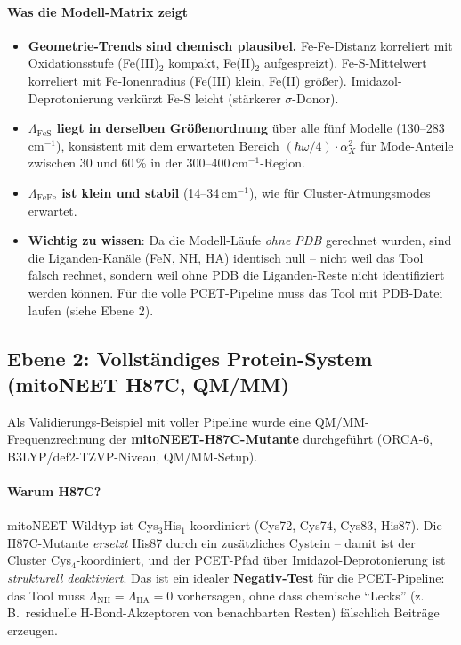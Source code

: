 \documentclass[11pt,a4paper,twoside]{article}
\theoremstyle{remark}
\begin{document}
\paragraph{Was die Modell-Matrix zeigt}
\begin{itemize}\setlength{\itemsep}{0pt}
  \item \textbf{Geometrie-Trends sind chemisch plausibel.}
        Fe-Fe-Distanz korreliert mit Oxidationsstufe (Fe(III)$_2$
        kompakt, Fe(II)$_2$ aufgespreizt). Fe-S-Mittelwert
        korreliert mit Fe-Ionenradius (Fe(III) klein, Fe(II)
        gr\"o{\ss}er). Imidazol-Deprotonierung verk\"urzt Fe-S leicht
        (st\"arkerer $\sigma$-Donor).
  \item \textbf{$\Lambda_\text{FeS}$ liegt in derselben Gr\"o{\ss}enordnung}
        \"uber alle f\"unf Modelle (130--283\,cm$^{-1}$), konsistent
        mit dem erwarteten Bereich
        $(\hbar\omega/4)\cdot\alpha_X^2$ f\"ur Mode-Anteile zwischen
        30 und 60\,\% in der 300--400\,cm$^{-1}$-Region.
  \item \textbf{$\Lambda_\text{FeFe}$ ist klein und stabil}
        (14--34\,cm$^{-1}$), wie f\"ur Cluster-Atmungsmodes
        erwartet.
  \item \textbf{Wichtig zu wissen}: Da die Modell-L\"aufe \emph{ohne PDB}
        gerechnet wurden, sind die Liganden-Kan\"ale (FeN, NH, HA)
        identisch null -- nicht weil das Tool falsch rechnet,
        sondern weil ohne PDB die Liganden-Reste nicht
        identifiziert werden k\"onnen. F\"ur die volle PCET-Pipeline
        muss das Tool mit PDB-Datei laufen (siehe Ebene 2).
\end{itemize}

\subsection{Ebene 2: Vollst\"andiges Protein-System
            (mitoNEET H87C, QM/MM)}
\label{sec:val-mitoneet-h87c}

Als Validierungs-Beispiel mit voller Pipeline wurde eine
QM/MM-Frequenzrechnung der \textbf{mitoNEET-H87C-Mutante}
durchgef\"uhrt (ORCA-6, B3LYP/def2-TZVP-Niveau, QM/MM-Setup).

\paragraph{Warum H87C?}
mitoNEET-Wildtyp ist Cys$_3$His$_1$-koordiniert (Cys72, Cys74,
Cys83, His87). Die H87C-Mutante \emph{ersetzt} His87 durch ein
zus\"atzliches Cystein -- damit ist der Cluster Cys$_4$-koordiniert,
und der PCET-Pfad \"uber Imidazol-Deprotonierung ist
\emph{strukturell deaktiviert}. Das ist ein idealer
\textbf{Negativ-Test} f\"ur die PCET-Pipeline: das Tool muss
$\Lambda_\text{NH} = \Lambda_\text{HA} = 0$ vorhersagen, ohne dass
chemische "`Lecks"' (z.\,B.\ residuelle H-Bond-Akzeptoren von
benachbarten Resten) f\"alschlich Beitr\"age erzeugen.
\end{document}

